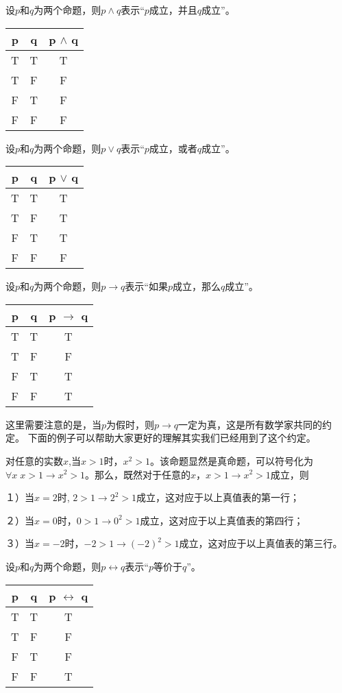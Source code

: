 \documentclass{article}
\begin{document}
\begin{CJK}{UTF8}{gbsn}
  设$p$和$q$为两个命题，则$p\land q$表示“$p$成立，并且$q$成立”。
  
  \begin{tabular}{cc|c}
    p& q& p $\land$ q\\
    \hline
    T&T&T\\
    T&F&F\\
    F&T&F\\
    F&F&F\\
  \end{tabular}

  设$p$和$q$为两个命题，则$p\lor q$表示“$p$成立，或者$q$成立”。
  
  \begin{tabular}{cc|c}
    p& q& p $\lor$ q\\
    \hline
    T&T&T\\
    T&F&T\\
    F&T&T\\
    F&F&F\\
  \end{tabular}

设$p$和$q$为两个命题，则$p\to q$表示“如果$p$成立，那么$q$成立”。  

    \begin{tabular}{cc|c}
    p& q& p $\to$ q\\
    \hline
    T&T&T\\
    T&F&F\\
    F&T&T\\
    F&F&T\\
    \end{tabular}\hspace{0.87cm}

    这里需要注意的是，当$p$为假时，则$p\to q$一定为真，这是所有数学家共同的约定。
    下面的例子可以帮助大家更好的理解其实我们已经用到了这个约定。

    对任意的实数$x$,当$x>1$时，$x^2 > 1$。该命题显然是真命题，可以符号化为$\forall x \; x > 1 \to x^2 > 1$。那么，既然对于任意的$x$，$x>1 \to x^2>1$成立，则

    １）当$x=2$时, $2 > 1 \to 2^2 >1$成立，这对应于以上真值表的第一行；

    ２）当$x=0$时，$0 > 1 \to 0^2 > 1$成立，这对应于以上真值表的第四行；

    ３）当$x=-2$时，$-2>1 \to (-2)^2 > 1$成立，这对应于以上真值表的第三行。
    
设$p$和$q$为两个命题，则$p\leftrightarrow q$表示“$p$等价于$q$”。  

  \begin{tabular}{cc|c}
    p& q& p $\leftrightarrow$ q\\
    \hline
    T&T&T\\
    T&F&F\\
    F&T&F\\
    F&F&T\\
  \end{tabular}


\end{CJK}
\end{document}

